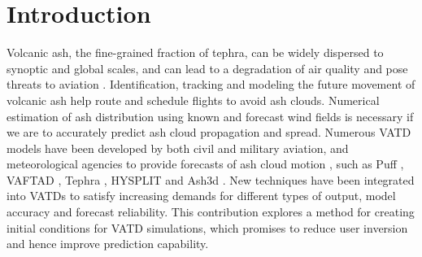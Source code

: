 \documentclass[utf8]{frontiersSCNS} %
\begin{document}
\section{Introduction}
Volcanic ash, the fine-grained fraction of tephra, can be widely dispersed to synoptic and global scales, and can lead to a degradation of air quality and pose threats to aviation \citep{tupper2007facing}. Identification, tracking and modeling the future movement of volcanic ash help route and schedule flights to avoid ash clouds. Numerical estimation of ash distribution using known and forecast wind fields is necessary if we are to accurately predict ash cloud propagation and spread. Numerous VATD models have been developed by both civil and military aviation, and meteorological agencies to provide forecasts of ash cloud motion \citep{witham2007comparison}, such as Puff \citep{tanaka1991development,searcy1998puff}, VAFTAD \citep{heffter1993volcanic}, Tephra \citep{bonadonna2005probabilistic}, HYSPLIT\citep{stein2015noaa, rolph2017real} and Ash3d \citep{schwaiger2012ash3d}. New techniques have been integrated into VATDs to satisfy increasing demands for different types of output, model accuracy and forecast reliability. This contribution explores a method for creating initial conditions for VATD simulations, which promises to reduce user inversion and hence improve prediction capability.
\end{document}
